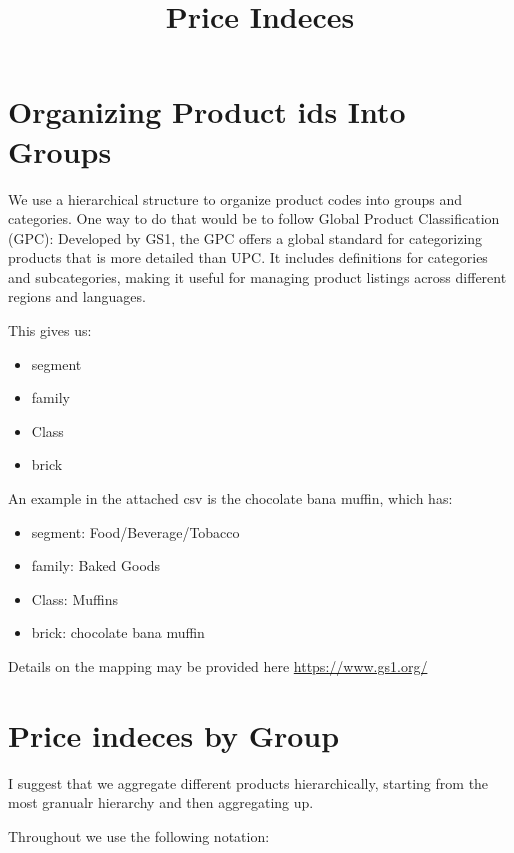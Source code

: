 \documentclass[11pt]{article}
\begin{document}
\title{Price Indeces}

\section{Organizing Product ids Into Groups}

We use a hierarchical structure to organize product codes into groups and categories. One way to do that would be to follow Global Product Classification (GPC): Developed by GS1, the GPC offers a global standard for categorizing products that is more detailed than UPC. It includes definitions for categories and subcategories, making it useful for managing product listings across different regions and languages.

This gives us:

\begin{itemize}
\item segment 
\item family
\item Class
\item brick
\end{itemize}

An example in the attached csv is the chocolate bana muffin, which has:

\begin{itemize}
	\item segment: Food/Beverage/Tobacco 
	\item family: Baked Goods
	\item Class: Muffins
	\item brick: chocolate bana muffin
	\end{itemize}

Details on the mapping may be provided here \url{https://www.gs1.org/}


\section{Price indeces by Group}

I suggest that we aggregate different products hierarchically, starting from the most granualr hierarchy and then aggregating up.

Throughout we use the following notation:
\end{document}
